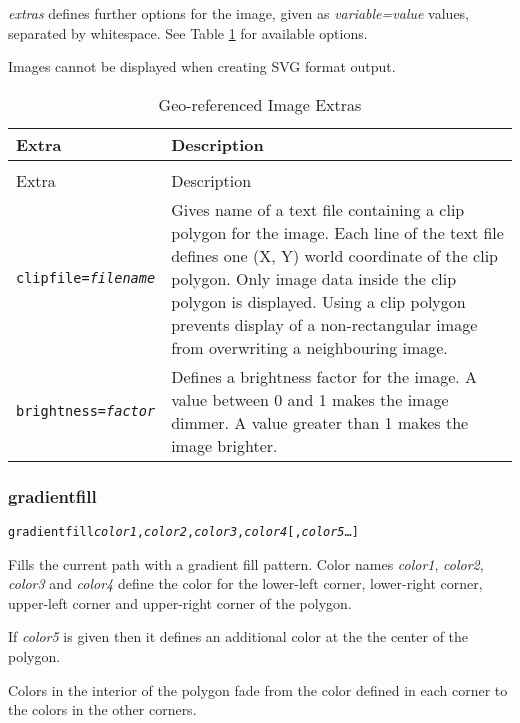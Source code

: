 \textit{extras} defines further options for the image, given as
\textit{variable=value} values, separated by whitespace.
See Table \ref{geoimageextras}
for available options.

Images cannot be displayed when creating SVG format output.

\begin{longtable}{|l|p{7cm}|}
\hline
\label{geoimageextras}
Extra & Description \\
\hline
\hline
\endfirsthead
\hline
\caption{Geo-referenced Image Extras} \\
\endfoot

\hline
Extra & Description \\
\hline
\hline
\endhead

\texttt{clipfile=\textit{filename}} &

Gives name of a text file containing a clip polygon for the image.
Each line of the text file defines one (X, Y) world coordinate
of the clip polygon.
Only image data inside the clip polygon is displayed.
Using a clip polygon prevents display of a non-rectangular image
from overwriting a neighbouring image. \\

\texttt{brightness=\textit{factor}} &

Defines a brightness factor for the image.
A value between 0 and 1 makes the image dimmer.
A value greater than 1 makes the image brighter. \\

\hline
\end{longtable}

\subsubsection{gradientfill}

\begin{alltt}
gradientfill \textit{color1}, \textit{color2}, \textit{color3}, \textit{color4} [, \textit{color5} \ldots]
\end{alltt}

Fills the current path with a gradient fill pattern.
Color names \textit{color1}, \textit{color2}, \textit{color3} and
\textit{color4} define the color for the lower-left corner,
lower-right corner, upper-left corner and upper-right corner of
the polygon.

If \textit{color5} is given then it defines an additional color at the
the center of the polygon.

Colors in the interior of the polygon fade from the color defined
in each corner to the colors in the other corners.

